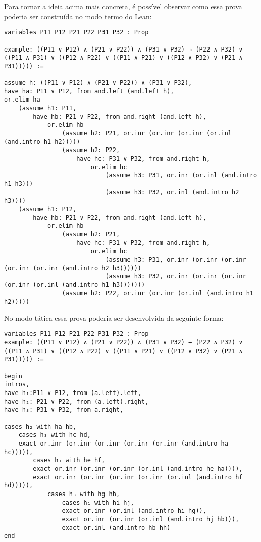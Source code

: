 Para tornar a ideia acima mais concreta, é possível observar como essa prova poderia ser construída no modo termo do Lean: 
\begin{lstlisting}
variables P11 P12 P21 P22 P31 P32 : Prop

example: ((P11 ∨ P12) ∧ (P21 ∨ P22)) ∧ (P31 ∨ P32) → (P22 ∧ P32) ∨ ((P11 ∧ P31) ∨ ((P12 ∧ P22) ∨ ((P11 ∧ P21) ∨ ((P12 ∧ P32) ∨ (P21 ∧ P31))))) :=

assume h: ((P11 ∨ P12) ∧ (P21 ∨ P22)) ∧ (P31 ∨ P32),
have ha: P11 ∨ P12, from and.left (and.left h),
or.elim ha
    (assume h1: P11, 
        have hb: P21 ∨ P22, from and.right (and.left h),
            or.elim hb
                (assume h2: P21, or.inr (or.inr (or.inr (or.inl (and.intro h1 h2)))))
                (assume h2: P22, 
                    have hc: P31 ∨ P32, from and.right h,
                        or.elim hc
                            (assume h3: P31, or.inr (or.inl (and.intro h1 h3)))
                            (assume h3: P32, or.inl (and.intro h2 h3))))
    (assume h1: P12, 
        have hb: P21 ∨ P22, from and.right (and.left h),
            or.elim hb
                (assume h2: P21, 
                    have hc: P31 ∨ P32, from and.right h,
                        or.elim hc
                            (assume h3: P31, or.inr (or.inr (or.inr (or.inr (or.inr (and.intro h2 h3))))))
                            (assume h3: P32, or.inr (or.inr (or.inr (or.inr (or.inl (and.intro h1 h3)))))))
                (assume h2: P22, or.inr (or.inr (or.inl (and.intro h1 h2)))))
\end{lstlisting}

No modo tática essa prova poderia ser desenvolvida da seguinte forma:

\begin{lstlisting}
variables P11 P12 P21 P22 P31 P32 : Prop
example: ((P11 ∨ P12) ∧ (P21 ∨ P22)) ∧ (P31 ∨ P32) → (P22 ∧ P32) ∨ ((P11 ∧ P31) ∨ ((P12 ∧ P22) ∨ ((P11 ∧ P21) ∨ ((P12 ∧ P32) ∨ (P21 ∧ P31))))) :=

begin
intros,
have h₁:P11 ∨ P12, from (a.left).left,
have h₂: P21 ∨ P22, from (a.left).right,
have h₃: P31 ∨ P32, from a.right,

cases h₂ with ha hb,
    cases h₃ with hc hd,
    exact or.inr (or.inr (or.inr (or.inr (or.inr (and.intro ha hc))))),
        cases h₁ with he hf,
        exact or.inr (or.inr (or.inr (or.inl (and.intro he ha)))),
        exact or.inr (or.inr (or.inr (or.inr (or.inl (and.intro hf hd))))),
            cases h₃ with hg hh,
                cases h₁ with hi hj,
                exact or.inr (or.inl (and.intro hi hg)),
                exact or.inr (or.inr (or.inl (and.intro hj hb))),
                exact or.inl (and.intro hb hh)
end
\end{lstlisting}

